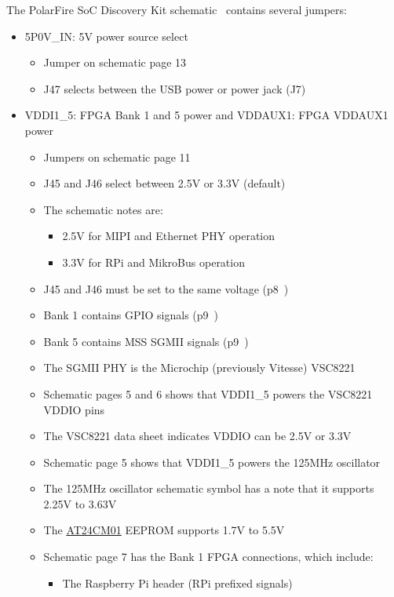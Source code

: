 The PolarFire SoC Discovery Kit schematic~\cite{Microchip_DISCO_SCH_2023}
contains several jumpers:
%
\begin{itemize}
%
\item \textsf{5P0V\_IN}: 5V power source select
\begin{itemize}
\item Jumper on schematic page 13
\item J47 selects between the USB power or power jack (J7)
\end{itemize}
%
\item \textsf{VDDI1\_5}: FPGA Bank 1 and 5 power
and \textsf{VDDAUX1}: FPGA VDDAUX1 power
\begin{itemize}
\item Jumpers on schematic page 11
\item J45 and J46 select between 2.5V or 3.3V (default)
\item The schematic notes are:
\begin{itemize}
\item 2.5V for MIPI and Ethernet PHY operation
\item 3.3V for RPi and MikroBus operation
\end{itemize}
\item J45 and J46 must be set to the same voltage (p8~\cite{Microchip_DISCO_UG_2025})
\item Bank 1 contains GPIO signals (p9~\cite{Microchip_DISCO_UG_2025})
\item Bank 5 contains MSS SGMII signals (p9~\cite{Microchip_DISCO_UG_2025})
\item The SGMII PHY is the Microchip (previously Vitesse) VSC8221~\cite{Microchip_VSC8221_2006}
\item Schematic pages 5 and 6 shows that \textsf{VDDI1\_5} powers the VSC8221 VDDIO pins
\item The VSC8221 data sheet indicates VDDIO can be 2.5V or 3.3V~\cite{Microchip_VSC8221_2006}
\item Schematic page 5 shows that \textsf{VDDI1\_5} powers the 125MHz oscillator
\item The 125MHz oscillator schematic symbol has a note that it supports 2.25V to 3.63V
\item The \href{https://www.microchip.com/en-us/product/at24cm01}{AT24CM01} EEPROM supports 1.7V to 5.5V
\item Schematic page 7 has the Bank 1 FPGA connections, which include:
\begin{itemize}
\item The Raspberry Pi header (RPi prefixed signals)

\end{itemize}
\end{itemize}
\end{itemize}
